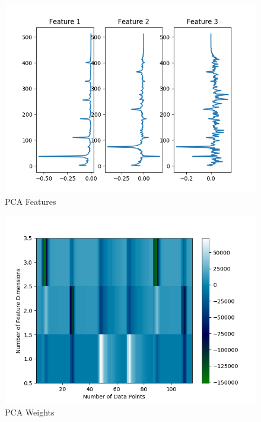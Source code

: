 \documentclass{article}[12pt]
\begin{document}
   \begin{figure}[ht]
   \centerline{
   \includegraphics[scale=1.0]{p1/pca_features_sound.png}}
   \caption{PCA Features}
   \label{fig:pca_f}
   \end{figure}
   
   \begin{figure}[ht]
   \centerline{
   \includegraphics[scale=1.0]{p1/pca_weights_sound.png}}
   \caption{PCA Weights}
   \label{fig:pca_w}
   \end{figure}   
\end{document}
